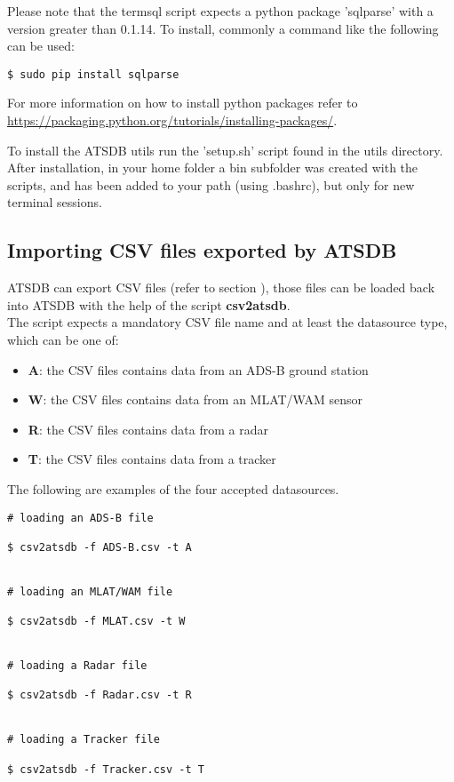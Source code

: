Please note that the termsql script expects a python package 'sqlparse' with a version greater than 0.1.14. To install, commonly a command like the following can be used:

\begin{verbatim}
$ sudo pip install sqlparse
\end{verbatim}

For more information on how to install python packages refer to \url{https://packaging.python.org/tutorials/installing-packages/}.

To install the ATSDB utils run the 'setup.sh' script found in the utils directory. \\

After installation, in your home folder a bin subfolder was created with the scripts, and has been added to your path (using .bashrc), but only for new terminal sessions.

\subsection{Importing CSV files exported by ATSDB}

ATSDB can export CSV files (refer to section ), those files can be loaded back into ATSDB with the help of the script \textbf{csv2atsdb}. \\

The script expects a mandatory CSV file name and at least the datasource type, which can be one of:
\label{sec:datasrc_type}
\begin{itemize}
\item \textbf{A}: the CSV files contains data from an ADS-B ground station
\item \textbf{W}: the CSV files contains data from an MLAT/WAM sensor
\item \textbf{R}: the CSV files contains data from a radar
\item \textbf{T}: the CSV files contains data from a tracker
\\
\end{itemize}

The following are examples of the four accepted datasources.

\begin{verbatim}
# loading an ADS-B file

$ csv2atsdb -f ADS-B.csv -t A


# loading an MLAT/WAM file

$ csv2atsdb -f MLAT.csv -t W


# loading a Radar file

$ csv2atsdb -f Radar.csv -t R


# loading a Tracker file

$ csv2atsdb -f Tracker.csv -t T
\end{verbatim}

